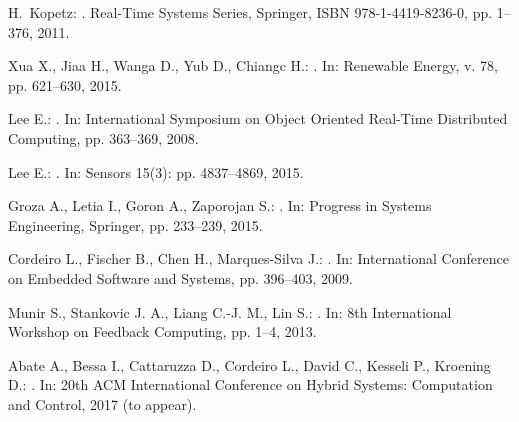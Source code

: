 \documentclass{acm_sen_article}
\begin{document}
{{%




\begin{thebibliography}{1}

H.~Kopetz:
.
\newblock Real-Time Systems Series, Springer, ISBN 978-1-4419-8236-0, pp. 1--376, 2011.

Xua X., Jiaa H., Wanga D., Yub D., Chiangc H.:
.
\newblock In: Renewable Energy, v. 78, pp. 621--630, 2015.

Lee E.:
.
\newblock In: International Symposium on Object Oriented Real-Time Distributed Computing, pp. 363--369, 2008.

Lee E.:
. 
\newblock In: Sensors 15(3): pp. 4837--4869, 2015.

Groza A., Letia I., Goron A., Zaporojan S.: 
.
\newblock In: Progress in Systems Engineering, Springer, pp. 233--239, 2015.

Cordeiro L., Fischer B., Chen H., Marques-Silva J.:
.
\newblock In: International Conference on Embedded Software and Systems, pp. 396--403, 2009.

Munir S., Stankovic J. A., Liang C.-J. M., Lin S.:
. 
\newblock In: 8th International Workshop on Feedback Computing, pp. 1--4, 2013.

Abate A., Bessa I., Cattaruzza D., Cordeiro L., David C., Kesseli P., Kroening D.:
.
\newblock In: 20th ACM International Conference on Hybrid Systems: Computation and Control, 2017 (to appear).


\end{thebibliography}}}
\end{document}
